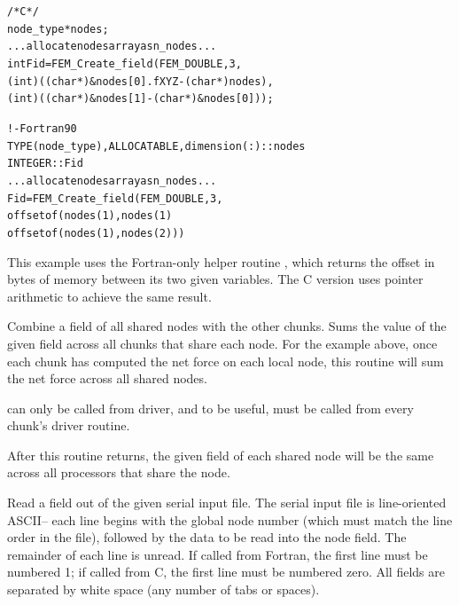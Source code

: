 \documentclass[10pt]{article}
\begin{document}
\begin{alltt}
          /* C */
          node_type *nodes;
          ...allocate nodes array as n_nodes...
          int Fid=FEM_Create_field(FEM_DOUBLE,3,
              (int)((char *)\&nodes[0].fXYZ-(char *)nodes),
              (int)((char *)\&nodes[1]-(char *)\&nodes[0]) );
 
          ! - Fortran90
          TYPE(node_type), ALLOCATABLE, dimension(:) :: nodes
          INTEGER :: Fid
          ...allocate nodes array as n_nodes...
          Fid=FEM_Create_field(FEM_DOUBLE,3,
              offsetof(nodes(1), nodes(1)%
              offsetof(nodes(1), nodes(2)) )
\end{alltt}

     This example uses the Fortran-only helper routine , which
     returns the offset in bytes of memory between its two given
     variables.  The C version uses pointer arithmetic to achieve the
     same result.


     Combine a field of all shared nodes with the other chunks.  Sums
     the value of the given field across all chunks that share each
     node.  For the example above, once each chunk has computed the net
     force on each local node, this routine will sum the net force
     across all shared nodes.

      can only be called from driver, and to be useful,
     must be called from every chunk's driver routine.

     After this routine returns, the given field of each shared node
     will be the same across all processors that share the node.


     Read a field out of the given serial input file.  The serial input
     file is line-oriented ASCII-- each line begins with the global
     node number (which must match the line order in the file),
     followed by the data to be read into the node field.  The
     remainder of each line is unread.  If called from Fortran, the
     first line must be numbered 1; if called from C, the first line
     must be numbered zero.  All fields are separated by white space
     (any number of tabs or spaces).
\end{document}
